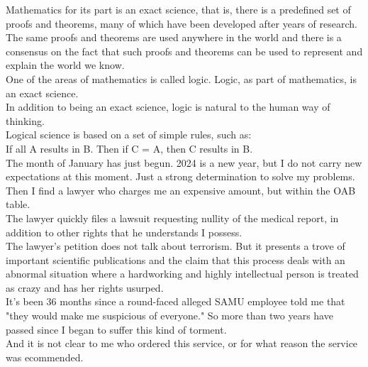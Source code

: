 \documentclass[11pt]{book}
\begin{document}
\noindent Mathematics for its part is an exact science, that is, there is a predefined set of proofs and theorems, many of which have been developed after years of research. The same proofs and theorems are used anywhere in the world and there is a consensus on the fact that such proofs and theorems can be used to represent and explain the world we know.  \\

\noindent One of the areas of mathematics is called logic. Logic, as part of mathematics, is an exact science. 
\\

\noindent In addition to being an exact science, logic is natural to the human way of thinking. \\

\noindent Logical science is based on a set of simple rules, such as: \\

\noindent If all A results in B. Then if C = A, then C results in B. \\

\noindent The month of January has just begun. 2024 is a new year, but I do not carry new expectations at this moment. Just a strong determination to solve my problems. \\

\noindent Then I find a lawyer who charges me an expensive amount, but within the OAB table. \\

\noindent The lawyer quickly files a lawsuit requesting nullity of the medical report, in addition to other rights that he understands I possess. \\

\noindent The lawyer's petition does not talk about terrorism. But it presents a trove of important scientific publications and the claim that this process deals with an abnormal situation where a hardworking and highly intellectual person is treated as crazy and has her rights usurped. \\

\noindent It's been 36 months since a round-faced alleged SAMU employee told me that "they would make me suspicious of everyone." So more than two years have passed since I began to suffer this kind of torment. \\

\noindent And it is not clear to me who ordered this service, or for what reason the service was ecommended. \\
\end{document}
